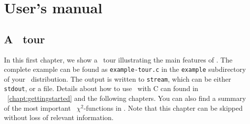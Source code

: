 
\part{User's manual}
\label{part:1}

\chapter{A \GLOBES\ tour}
\label{chapter:tour}

In this first chapter, we show a \GLOBES\ tour illustrating the
main features of \GLOBES . The complete example  
can be found as {\tt example-tour.c} in the \verb+example+ subdirectory 
of your \GLOBES\ distribution.
The output is written to {\tt stream}, which can be either {\tt stdout},
or a file. Details about how to use \GLOBES\ with C can found in \Chapt~\ref{chapt:gettingstarted} and the following chapters.
You can also find a summary of the most important \GLOBES\ $\chi^2$-functions in . Note that this chapter
can be skipped without loss of relevant information.

